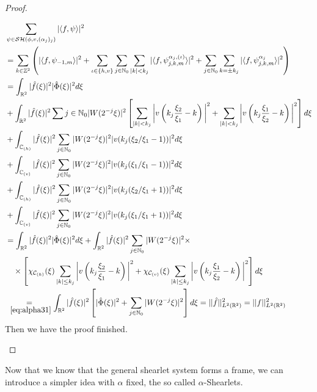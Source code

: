 \begin{proof}
\begin{itemize}
$$
\begin{aligned}
&\sum_{\psi\in\mathcal{SH}(\phi,v,(\alpha_j)_j)}|\langle f,\psi\rangle |^2\\
&=\sum_{k\in\mathbb{Z}^2}\left( |\langle f,\psi_{-1,m}\rangle|^2+\sum_{\iota\in\{h,v\}}\sum_{j\in\mathbb{N}_0}\sum_{|k|<k_j}|\langle f,\psi_{j,k,m}^{\alpha_j,(\iota)}\rangle|^2+\sum_{j\in\mathbb{N}_0}\sum_{k=\pm k_j}|\langle f,\psi_{j,k,m}^{\alpha_j}\rangle |^2 \right)\\
&=\int_{\mathbb{R}^2}|\hat{f}(\xi)|^2|\hat{\Phi}(\xi)|^2d\xi\\
&+\int_{\mathbb{R}^2}|\hat{f}(\xi)|^2\sum{j\in\mathbb{N}_0}|W(2^{-j}\xi)|^2\left[ \sum_{|k|<k_j}\bigg| v\left( k_j\frac{\xi_2}{\xi_1}-k\right)\bigg|^2+\sum_{|k|<k_j}\bigg| v\left(k_j\frac{\xi_1}{\xi_2}-k\right)\bigg|^2\right] d\xi\\
&+\int_{\mathbb{C}_{(h)}}|\hat{f}(\xi)|^2\sum_{j\in\mathbb{N}_0}|W(2^{-j}\xi)|^2|v(k_j(\xi_2/\xi_1-1))|^2d\xi\\
&+\int_{\mathbb{C}_{(v)}}|\hat{f}(\xi)|^2\sum_{j\in\mathbb{N}_0}|W(2^{-j}\xi)|^2|v(k_j(\xi_1/\xi_1-1))|^2d\xi\\
&+\int_{\mathbb{C}_{(h)}}|\hat{f}(\xi)|^2\sum_{j\in\mathbb{N}_0}|W(2^{-j}\xi)|^2|v(k_j(\xi_2/\xi_1+1))|^2d\xi\\
&+\int_{\mathbb{C}_{(v)}}|\hat{f}(\xi)|^2\sum_{j\in\mathbb{N}_0}|W(2^{-j}\xi)|^2|v(k_j(\xi_1/\xi_1+1))|^2d\xi\\
&=\int_{\mathbb{R}^2}|\hat{f}(\xi)|^2|\hat{\Phi}(\xi)|^2d\xi+\int_{\mathbb{R}^2}|\hat{f}(\xi)|^2\sum_{j\in\mathbb{N}_0}|W(2^{-j}\xi)|^2\times \\
&\quad \times \left[ \chi_{\mathcal{C}_{(h)}}(\xi)\sum_{|k|\leq k_j}\bigg| v\left( k_j\frac{\xi_2}{\xi_1}-k\right)\bigg|^2+\chi_{\mathcal{C}_{(v)}}(\xi)\sum_{|k|\leq k_j}\bigg| v\left( k_j\frac{\xi_1}{\xi_2}-k\right)\bigg|^2\right]d\xi\\
&\underset{~\ref{eq:alpha31}}{=}\int_{\mathbb{R}^2}|\hat{f}(\xi)|^2\left[|\hat{\Phi}(\xi)|^2+\sum_{j\in\mathbb{N}_0}|W(2^{-j}\xi)|^2\right]d\xi = ||\hat{f}||^2_{L^2(\mathbb{R}^2)}=||f||^2_{L^2(\mathbb{R}^2)}
\end{aligned}
$$
Then we have the proof finished. 
\end{itemize}
\end{proof}

\bigskip

Now that we know that the general shearlet system forms a frame, we can introduce a simpler idea with $\alpha$ fixed, the so called $\alpha$-Shearlets.

